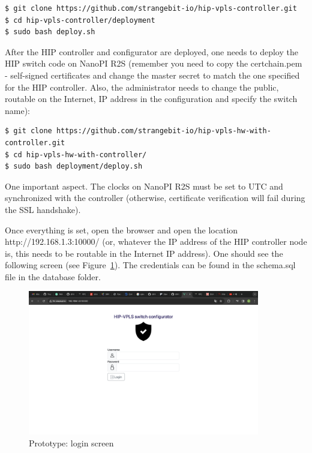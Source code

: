 \begin{verbatim}
$ git clone https://github.com/strangebit-io/hip-vpls-controller.git
$ cd hip-vpls-controller/deployment
$ sudo bash deploy.sh
\end{verbatim}

After the HIP controller and configurator are deployed, 
one needs to deploy the HIP switch code on NanoPI R2S 
(remember you need to copy the certchain.pem - self-signed 
certificates and change the master secret to match the one 
specified for the HIP controller. Also, the administrator 
needs to change the public, routable on the Internet, 
IP address in the configuration and specify the switch name):


\begin{verbatim}
$ git clone https://github.com/strangebit-io/hip-vpls-hw-with-controller.git
$ cd hip-vpls-hw-with-controller/
$ sudo bash deployment/deploy.sh
\end{verbatim}

One important aspect. The clocks on NanoPI R2S must be set to UTC and 
synchronized with the controller (otherwise, certificate verification 
will fail during the SSL handshake).

Once everything is set, open the browser and open the location 
http://192.168.1.3:10000/ (or, whatever the IP address of the HIP 
controller node is, this needs to be routable in the Internet IP 
address). One should see the following screen (see 
Figure~\ref{fig:login}). The credentials can be found in the 
schema.sql file in the database folder. 

\begin{figure}[h!]
\centering
\includegraphics[width=0.9\textwidth]{graphics/login_screen.png}
\caption{Prototype: login screen}
\label{fig:login}
\end{figure}

